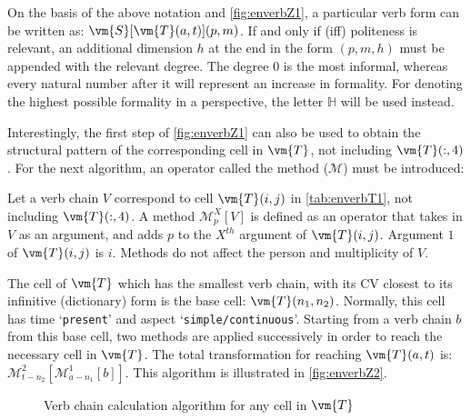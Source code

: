 On the basis of the above notation and \autoref{fig:enverbZ1}, a particular verb form can be written as: $\vm{S}[\vm{T}(a,t)](p,m)$. If and only if (iff) politeness is relevant, an additional dimension $h$ at the end  in the form $(p,m,h)$ must be appended with the relevant degree. The degree $0$ is the most informal, whereas every natural number after it will represent an increase in formality. For denoting the highest possible formality in a perspective, the letter $\mathbb{H}$ will be used instead.

Interestingly, the first step of \autoref{fig:enverbZ1} can also be used to  obtain the structural pattern of the corresponding cell in $\vm{T}$, not including $\vm{T}(:,4)$. For the next algorithm, an operator called the method ($\mathcal{M}$) must be introduced:
\begin{syntax}
    Let a verb chain $V$ correspond to cell $\vm{T}(i,j)$ in \autoref{tab:enverbT1}, not including $\vm{T}(:,4)$. A method $\mathcal{M}^{X}_{p}[V]$ is defined as an operator that takes in $V$ as an argument, and adds $p$ to the $X^{th}$ argument of $\vm{T}(i,j)$. Argument $1$ of $\vm{T}(i,j)$ is $i$. Methods do not affect the person and multiplicity of $V$.
\end{syntax}
The cell of $\vm{T}$ which has the smallest verb chain, with its CV closest to its  infinitive (dictionary) form is the base cell: $\vm{T}(n_1,n_2)$. Normally, this cell   has time `\texttt{present}' and aspect `\texttt{simple/continuous}'. Starting from a verb chain $b$ from this base cell, two methods are applied successively in order to reach the necessary cell in $\vm{T}$. The total transformation for reaching $\vm{T}(a,t)$ is: $\mathcal{M}^{2}_{t-n_2}[\mathcal{M}^{1}_{a-n_1}[b]]$. This algorithm is illustrated in \autoref{fig:enverbZ2}.
\begin{figure}[bth]
    \centering
{}
\caption{Verb chain calculation algorithm for any cell in $\vm{T}$}
\label{fig:enverbZ2}
\end{figure}

